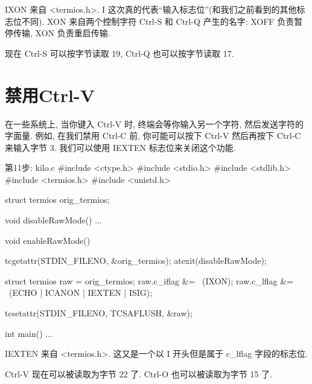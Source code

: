 \documentclass[lang=cn,newtx,10pt,scheme=chinese]{elegantbook}
\begin{document}
IXON 来自 <termios.h>. I 这次真的代表``输入标志位''(和我们之前看到的其他标志位不同). XON 来自两个控制字符 Ctrl-S 和 Ctrl-Q 产生的名字: XOFF 负责暂停传输, XON 负责重启传输.

现在 Ctrl-S 可以按字节读取 19, Ctrl-Q 也可以按字节读取 17.

\section{禁用Ctrl-V}

在一些系统上, 当你键入 Ctrl-V 时, 终端会等你输入另一个字符, 然后发送字符的字面量. 例如, 在我们禁用 Ctrl-C 前, 你可能可以按下 Ctrl-V 然后再按下 Ctrl-C 来输入字节 3. 我们可以使用 IEXTEN 标志位来关闭这个功能.

\begin{mycode}{第11步: kilo.c}
#include <ctype.h>
#include <stdio.h>
#include <stdlib.h>
#include <termios.h>
#include <unistd.h>

struct termios orig_termios;

void disableRawMode() { ... }

void enableRawMode() {
  tcgetattr(STDIN_FILENO, &orig_termios);
  atexit(disableRawMode);

  struct termios raw = orig_termios;
  raw.c_iflag &= ~(IXON);
  raw.c_lflag &= ~(ECHO | ICANON | IEXTEN | ISIG);

  tcsetattr(STDIN_FILENO, TCSAFLUSH, &raw);
}

int main() { ... }
\end{mycode}

IEXTEN 来自 <termios.h>. 这又是一个以 I 开头但是属于 c\_lflag 字段的标志位.

Ctrl-V 现在可以被读取为字节 22 了. Ctrl-O 也可以被读取为字节 15 了.
\end{document}
